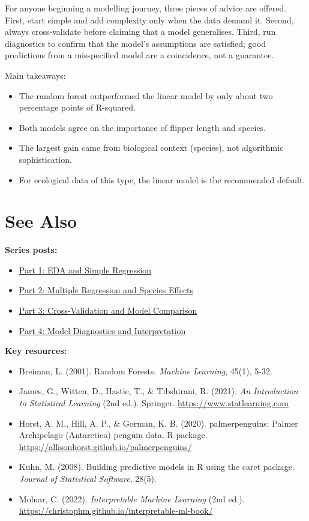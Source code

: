 \documentclass[
  letterpaper,
  DIV=11,
  numbers=noendperiod]{scrartcl}
\providecommand{\tightlist}{%
  \setlength{\itemsep}{0pt}\setlength{\parskip}{0pt}}
\begin{document}
For anyone beginning a modelling journey, three pieces of advice are
offered. First, start simple and add complexity only when the data
demand it. Second, always cross-validate before claiming that a model
generalises. Third, run diagnostics to confirm that the model's
assumptions are satisfied; good predictions from a misspecified model
are a coincidence, not a guarantee.

Main takeaways:

\begin{itemize}
\tightlist
\item
  The random forest outperformed the linear model by only about two
  percentage points of R-squared.
\item
  Both models agree on the importance of flipper length and species.
\item
  The largest gain came from biological context (species), not
  algorithmic sophistication.
\item
  For ecological data of this type, the linear model is the recommended
  default.
\end{itemize}

\section{See Also}\label{see-also}

\textbf{Series posts:}

\begin{itemize}
\tightlist
\item
  \href{../08-palmerpenguinspart1/\%20palmerpenguinspart1/}{Part 1: EDA
  and Simple Regression}
\item
  \href{../09-palmerpenguinspart2/\%20palmerpenguinspart2/}{Part 2:
  Multiple Regression and Species Effects}
\item
  \href{../10-palmerpenguinspart3/\%20palmerpenguinspart3/}{Part 3:
  Cross-Validation and Model Comparison}
\item
  \href{../11-palmerpenguinspart4/\%20palmerpenguinspart4/}{Part 4:
  Model Diagnostics and Interpretation}
\end{itemize}

\textbf{Key resources:}

\begin{itemize}
\tightlist
\item
  Breiman, L. (2001). Random Forests. \emph{Machine Learning}, 45(1),
  5-32.
\item
  James, G., Witten, D., Hastie, T., \& Tibshirani, R. (2021). \emph{An
  Introduction to Statistical Learning} (2nd ed.). Springer.
  \url{https://www.statlearning.com}
\item
  Horst, A. M., Hill, A. P., \& Gorman, K. B. (2020). palmerpenguins:
  Palmer Archipelago (Antarctica) penguin data. R package.
  \url{https://allisonhorst.github.io/palmerpenguins/}
\item
  Kuhn, M. (2008). Building predictive models in R using the caret
  package. \emph{Journal of Statistical Software}, 28(5).
\item
  Molnar, C. (2022). \emph{Interpretable Machine Learning} (2nd ed.).
  \url{https://christophm.github.io/interpretable-ml-book/}
\end{itemize}
\end{document}

